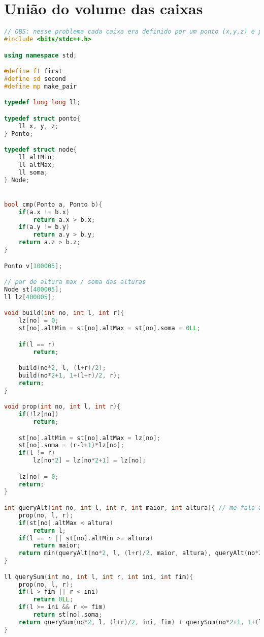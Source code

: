 \documentclass[12pt,a4paper, twoside]{report}
\begin{document}
\section{União do volume das caixas}
\noindent\begin{lstlisting}[caption=União do volume das caixas,language=C++]
// OBS: nesse problema cada caixa era definido por um ponto (x,y,z) e pela origem (0,0,0)
#include <bits/stdc++.h>

using namespace std;

#define ft first
#define sd second
#define mp make_pair

typedef long long ll;

typedef struct ponto{
    ll x, y, z;
} Ponto;

typedef struct node{
    ll altMin;
    ll altMax;
    ll soma;
} Node;


bool cmp(Ponto a, Ponto b){
    if(a.x != b.x)
        return a.x > b.x;
    if(a.y != b.y)
        return a.y > b.y;
    return a.z > b.z;
}

Ponto v[100005];

// par de altura max / soma das alturas
Node st[400005];
ll lz[400005];

void build(int no, int l, int r){
    lz[no] = 0;
    st[no].altMin = st[no].altMax = st[no].soma = 0LL;

    if(l == r)
        return;

    build(no*2, l, (l+r)/2);
    build(no*2+1, 1+(l+r)/2, r);
    return;
}

void prop(int no, int l, int r){
    if(!lz[no]) 
        return;

    st[no].altMin = st[no].altMax = lz[no];
    st[no].soma = (r-l+1)*lz[no];
    if(l != r) 
        lz[no*2] = lz[no*2+1] = lz[no];

    lz[no] = 0;
    return;
}

int queryAlt(int no, int l, int r, int maior, int altura){ // me fala a primeira posicao <= maior q eh "mais baixa q o i" (tem z < vi.z)
    prop(no, l, r);
    if(st[no].altMax < altura)
        return l;
    if(l == r || st[no].altMin >= altura)
        return maior;
    return min(queryAlt(no*2, l, (l+r)/2, maior, altura), queryAlt(no*2+1, 1+(l+r)/2, r, maior, altura));
}

ll querySum(int no, int l, int r, int ini, int fim){
    prop(no, l, r);
    if(l > fim || r < ini)
        return 0LL;
    if(l >= ini && r <= fim)
        return st[no].soma;
    return querySum(no*2, l, (l+r)/2, ini, fim) + querySum(no*2+1, 1+(l+r)/2, r, ini, fim);
}


\end{lstlisting}
\end{document}
